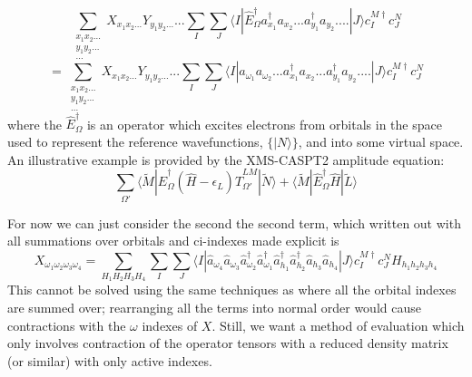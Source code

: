 \documentclass[12pt]{article}
\begin{document}
\begin{equation*}
\sum_{\substack{ x_{1}x_{2}...\\ y_{1}y_{2}... \\ ...}} X_{x_{1}x_{2}...} Y_{y_{1}y_{2}...} ...
\sum_{I}\sum_{J}
\langle I | \hat{E}^{\dagger}_{\Omega} a^{\dagger}_{x_{1}} a_{x_{2}}...a^{\dagger}_{y_{1}}a_{y_{2}}....| J \rangle 
 c^{M \dagger}_{I}c^{N}_{J}
\end{equation*}
\begin{equation}
=
\sum_{\substack{ x_{1}x_{2}...\\ y_{1}y_{2}... \\ ...}} X_{x_{1}x_{2}...} Y_{y_{1}y_{2}...} ...
\sum_{I}\sum_{J}
\langle I | a_{\omega_{1}} a_{\omega_{2}}.. .a^{\dagger}_{x_{1}} a_{x_{2}}...a^{\dagger}_{y_{1}}a_{y_{2}}....| J \rangle 
 c^{M \dagger}_{I}c^{N}_{J}
\label{eqn:basic_2nd_quantized_projector}
\end{equation}
 \noindent where the $\hat{E}^{\dagger}_{\Omega}$ is an operator
which excites electrons from orbitals in the space used to represent
the reference wavefunctions, $\{|N\rangle\}$, and into some
virtual space.  \\

\noindent An illustrative example is provided by the XMS-CASPT2 amplitude equation: 
\begin{equation*}
\sum_{\Omega'}
\langle \tilde{M} | \hat{E}^{\dagger}_{\Omega} (\hat{H} - \epsilon_{L}) \hat{T}^{LM}_{\Omega'}| \tilde{N} \rangle 
+
\langle \tilde{M} | \hat{E}^{\dagger}_{\Omega}\hat{H}| \tilde{L} \rangle 
\end{equation*}

For now we can just consider the second the second term, which written out with all summations over orbitals and 
ci-indexes made explicit is
\begin{equation}
X_{\omega_{1}\omega_{2}\omega_{3}\omega_{4}}
= 
\sum_{ H_{1}H_{2}H_{3}H_{4}} 
\sum_{I}\sum_{J}
\langle I |
\hat{a}_{\omega_{4}} \hat{a}_{\omega_{3}}\hat{a}^{\dagger}_{\omega_{2}}\hat{a}^{\dagger}_{\omega_{1}}
\hat{a}^{\dagger}_{h_{1}} \hat{a}^{\dagger}_{h_{2}}\hat{a}_{h_{3}}\hat{a}_{h_{4}}| J \rangle  
c^{M \dagger}_{I}c^{N}_{J} H_{h_{1}h_{2}h_{3}h_{4}}
\label{eqn:XH_example}
\end{equation}
This cannot be solved using the same techniques as where all the orbital indexes are summed over; rearranging all the terms into 
normal order would  cause contractions with the $\omega$ indexes of $X$. Still, we want a method of evaluation which only
involves contraction of the operator tensors with a reduced density matrix (or similar) with only active indexes.
\end{document}
